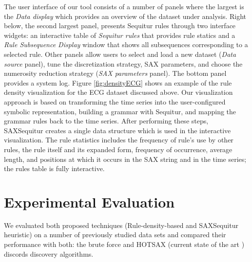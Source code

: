 \documentclass{llncs}
\begin{document}
The user interface of our tool consists of a number of panels where the largest is the \textit{Data display} which provides an overview of the dataset under analysis. Right below, the second largest panel, presents Sequitur rules through two interface widgets: an interactive table of \textit{Sequitur rules} that provides rule statics and a \textit{Rule Subsequence Display} window that shows all subsequences corresponding to a selected rule. Other panels allow users to select and load a new dataset (\textit{Data source} panel), tune the discretization strategy, SAX parameters, and choose the numerosity reduction strategy (\textit{SAX parameters} panel). The bottom panel provides a system log. Figure \ref{fig:densityECG} shows an example of the rule density visualization for the ECG dataset discussed above.
Our visualization approach is based on transforming the time series into the user-configured symbolic representation, building a grammar with Sequitur, and mapping the grammar rules back to the time series. After performing these steps, SAXSequitur creates a single data structure which is used in the interactive visualization. The rule statistics includes the frequency of rule's  use by other rules, the rule itself and its expanded form, frequency of occurrence, average length, and positions at which it occurs in the SAX string and in the time series; the rules table is fully interactive. 

\section{Experimental Evaluation}
We evaluated both proposed techniques (Rule-density-based and SAXSequitur heuristic) on a number of previously studied data sets and compared their performance with both: the brute force and HOTSAX (current state of the art \cite{chan_anomaly}) discords discovery algorithms. 
\end{document}
